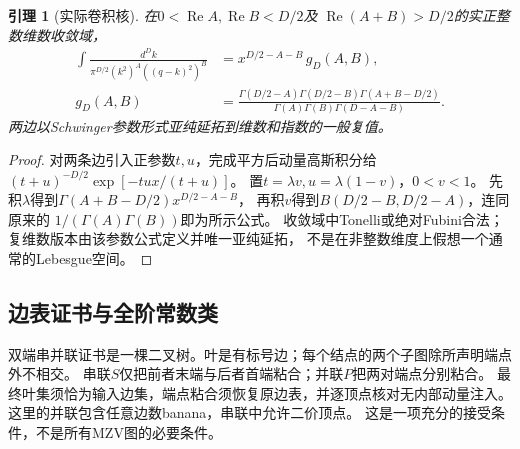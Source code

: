 \documentclass[11pt,a4paper]{ctexart}
\theoremstyle{cnplain}\newtheorem{theorem}{定理}[section]
\newtheorem{lemma}[theorem]{引理}
\theoremstyle{definition}\newtheorem{definition}[theorem]{定义}
\theoremstyle{remark}\newtheorem{remark}[theorem]{注}
\begin{document}
\begin{lemma}[实际卷积核]\label{lem:masslesskernel}
在$0<\operatorname{Re} A,\operatorname{Re} B<D/2$及
$\operatorname{Re}(A+B)>D/2$的实正整数维数收敛域，
\begin{align}
 \int\frac{d^Dk}{\pi^{D/2}(k^2)^A((q-k)^2)^B}
 &=x^{D/2-A-B}\,g_D(A,B),\\
 g_D(A,B)&=
 \frac{\Gamma(D/2-A)\Gamma(D/2-B)\Gamma(A+B-D/2)}
 {\Gamma(A)\Gamma(B)\Gamma(D-A-B)}.\label{eq:masslesskernel}
\end{align}
两边以Schwinger参数形式亚纯延拓到维数和指数的一般复值。
\end{lemma}
\begin{proof}
对两条边引入正参数$t,u$，完成平方后动量高斯积分给
$(t+u)^{-D/2}\exp[-tu x/(t+u)]$。
置$t=\lambda v,u=\lambda(1-v)$，$0<v<1$。
先积$\lambda$得到$\Gamma(A+B-D/2)x^{D/2-A-B}$，
再积$v$得到$B(D/2-B,D/2-A)$，连同原来的
$1/(\Gamma(A)\Gamma(B))$即为所示公式。
收敛域中Tonelli或绝对Fubini合法；复维数版本由该参数公式定义并唯一亚纯延拓，
不是在非整数维度上假想一个通常的Lebesgue空间。
\end{proof}

\subsection{边表证书与全阶常数类}
双端串并联证书是一棵二叉树。叶是有标号边；每个结点的两个子图除所声明端点外不相交。
串联$S$仅把前者末端与后者首端粘合；并联$P$把两对端点分别粘合。
最终叶集须恰为输入边集，端点粘合须恢复原边表，并逐顶点核对无内部动量注入。
这里的并联包含任意边数banana，串联中允许二价顶点。
这是一项充分的接受条件，不是所有MZV图的必要条件。
\end{document}
